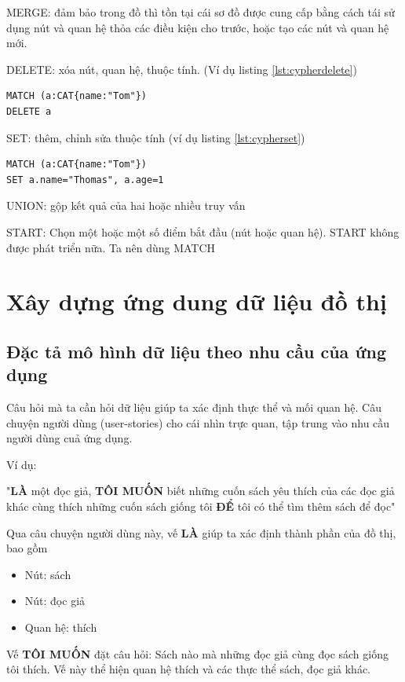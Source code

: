 MERGE: đảm bảo trong đồ thì tồn tại cái sơ đồ được cung cấp bằng cách tái sử dụng nút và quan hệ thỏa các điều kiện cho trước, hoặc tạo các nút và quan hệ mới. 

DELETE: xóa nút, quan hệ, thuộc tính. (Ví dụ listing \ref{lst:cypherdelete})
\begin{lstlisting}[caption={Cypher xóa}, label={lst:cypherdelete}]
MATCH (a:CAT{name:"Tom"})
DELETE a
\end{lstlisting}

SET: thêm, chỉnh sửa thuộc tính (ví dụ listing \ref{lst:cypherset})
\begin{lstlisting}[caption={Cypher sửa}, label={lst:cypherset}]
MATCH (a:CAT{name:"Tom"})
SET a.name="Thomas", a.age=1
\end{lstlisting}

UNION: gộp kết quả của hai hoặc nhiều truy vấn 

START: Chọn một hoặc một số điểm bắt đầu (nút hoặc quan hệ). START không được phát triển nữa. Ta nên dùng MATCH 

\section{Xây dựng ứng dung dữ liệu đồ thị}

\subsection{Đặc tả mô hình dữ liệu theo nhu cầu của ứng dụng}

Câu hỏi mà ta cần hỏi dữ liệu giúp ta xác định thực thể và mối quan hệ. Câu chuyện người dùng (user-stories) cho cái nhìn trực quan, tập trung vào nhu cầu người dùng cuả ứng dụng. 

Ví dụ: 

"\textbf{LÀ} một đọc giả, \textbf{TÔI MUỐN} biết những cuốn sách yêu thích của các đọc giả khác cùng thích những cuốn sách giống tôi \textbf{ĐỂ} tôi có thể tìm thêm sách để đọc"

Qua câu chuyện người dùng này, vế \textbf{LÀ} giúp ta xác định thành phần của đồ thị, bao gồm 

\begin{itemize}
\item Nút: sách  
\item Nút: đọc giả 
\item Quan hệ: thích  
\end{itemize}

Vế \textbf{TÔI MUỐN} đặt câu hỏi: Sách nào mà những đọc giả cùng đọc sách giống tôi thích. Vế này thể hiện quan hệ thích  và các thực thể sách, đọc giả khác.

